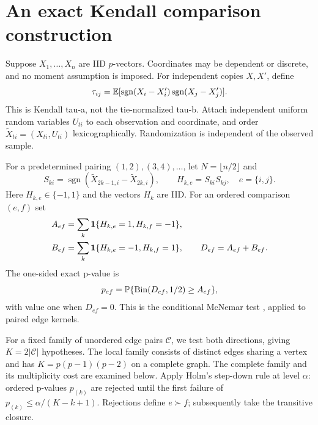 \documentclass[11pt]{article}
\theoremstyle{plain}
\theoremstyle{definition}\newtheorem{remark}{Remark}\newtheorem{example}{Example}
\begin{document}
\section{An exact Kendall comparison construction}\label{sec:kendall}
Suppose $X_1,\ldots,X_n$ are IID $p$-vectors. Coordinates may be dependent or discrete, and no moment assumption is imposed. For independent copies $X,X'$, define
\[
 \tau_{ij}=\mathbb E[\operatorname{sgn}(X_i-X_i')\operatorname{sgn}(X_j-X_j')].
\]
This is Kendall tau-a, not the tie-normalized tau-b. Attach independent uniform random variables $U_{ti}$ to each observation and coordinate, and order $\widetilde X_{ti}=(X_{ti},U_{ti})$ lexicographically. Randomization is independent of the observed sample.

For a predetermined pairing $(1,2),(3,4),\ldots$, let $N=\lfloor n/2\rfloor$ and
\[
 S_{ki}=\operatorname{sgn}(\widetilde X_{2k-1,i}-\widetilde X_{2k,i}),\qquad
 H_{k,e}=S_{ki}S_{kj},\quad e=\{i,j\}.
\]
Here $H_{k,e}\in\{-1,1\}$ and the vectors $H_k$ are IID. For an ordered comparison $(e,f)$ set
\[
 \begin{aligned} A_{ef}&=\sum_k\mathbf1\{H_{k,e}=1,H_{k,f}=-1\},\\
 B_{ef}&=\sum_k\mathbf1\{H_{k,e}=-1,H_{k,f}=1\},\qquad D_{ef}=A_{ef}+B_{ef}.\end{aligned}
\]
The one-sided exact p-value is
\begin{equation}\label{eq:pvalue}
 p_{ef}=\mathbb P\{\operatorname{Bin}(D_{ef},1/2)\ge A_{ef}\},
\end{equation}
with value one when $D_{ef}=0$. This is the conditional McNemar test \citep{mcnemar1947}, applied to paired edge kernels.

For a fixed family of unordered edge pairs $\mathcal C$, we test both directions, giving $K=2|\mathcal C|$ hypotheses. The local family consists of distinct edges sharing a vertex and has $K=p(p-1)(p-2)$ on a complete graph. The complete family and its multiplicity cost are examined below. Apply Holm's step-down rule \citep{holm1979} at level $\alpha$: ordered p-values $p_{(k)}$ are rejected until the first failure of $p_{(k)}\le\alpha/(K-k+1)$. Rejections define $e\widehat{\succ}f$; subsequently take the transitive closure.
\end{document}
